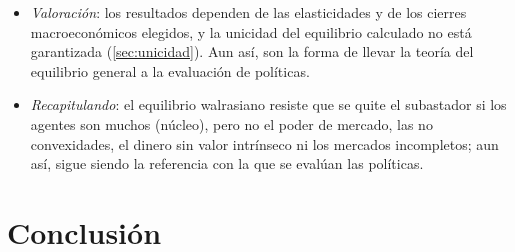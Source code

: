 \documentclass[11pt]{article}
\begin{document}
\begin{itemize}
\begin{itemize}
  \item \emph{Macroeconomía}: los modelos de equilibrio general dinámicos y estocásticos son la versión agregada e intertemporal del mismo programa .
    \begin{itemize}
    \item En España, el Ministerio de Economía y Hacienda desarrolló en 2008 el modelo REMS, con la Universidad de Valencia, la Fundación Rafael del Pino y BBVA\nocite{BoscaEtAl2010REMS}.
    \item Su versión estimada, EREMS\nocite{BoscaEtAl2020Financial}, es la que usa el Observatorio sobre el Ciclo Económico en España de BBVA Research, Fedea y la Fundación Rafael del Pino: cuando la economía recibe perturbaciones, la respuesta de las variables endógenas permite descomponer el crecimiento en sus causas.
    \item A mediados de 2026 las perturbaciones de demanda y crédito sumaban unos 1,3~puntos al crecimiento del PIB por persona en edad de trabajar, respecto de su media, y las de oferta (sobre todo el capital residencial) restaban unos 1,1\nocite{BoscaEtAl2026CicloOct}.\footnote{Las instituciones europeas usan modelos de la misma familia: QUEST en la Comisión\nocite{JRC2026QUEST}, el NAWM II en el BCE\nocite{CoenenEtAl2018NAWMII} y FiMod o BEMOD en el Banco de España\nocite{StahlerThomas2012FiMod,AndresBurrielEstrada2006BEMOD}. EREMS distingue perturbaciones financieras, fiscales (de ingresos y de gastos), externas, de competencia en el mercado de bienes y servicios y otras macroeconómicas.}
    \end{itemize}
  \end{itemize}
\item \emph{Valoración}: los resultados dependen de las elasticidades y de los cierres macroeconómicos elegidos, y la unicidad del equilibrio calculado no está garantizada (\ref{sec:unicidad}). Aun así, son la forma de llevar la teoría del equilibrio general a la evaluación de políticas.
\item \emph{Recapitulando}: el equilibrio walrasiano resiste que se quite el subastador si los agentes son muchos (núcleo), pero no el poder de mercado, las no convexidades, el dinero sin valor intrínseco ni los mercados incompletos; aun así, sigue siendo la referencia con la que se evalúan las políticas.
\end{itemize}


\section*{Conclusión}
\end{document}
